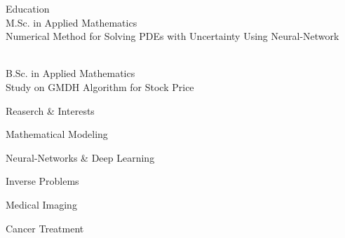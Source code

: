 \documentclass{resume} %
\begin{document}
\begin{rSection}{Education}
	 \\%
	M.Sc. in Applied Mathematics \smallskip \\
	Numerical Method for Solving PDEs with Uncertainty Using Neural-Network 
	
	\\ %
	B.Sc. in Applied Mathematics \smallskip \\
	Study on GMDH Algorithm for Stock Price
\end{rSection}
\begin{rSection}{Reaserch \& Interests}	
	\begin{rSubsection}{}{}{}{}
		\item Mathematical Modeling
		\item Neural-Networks \& Deep Learning
		\item Inverse Problems
		\item Medical Imaging
		\item Cancer Treatment	
	\end{rSubsection}
\end{rSection}
\end{document}
